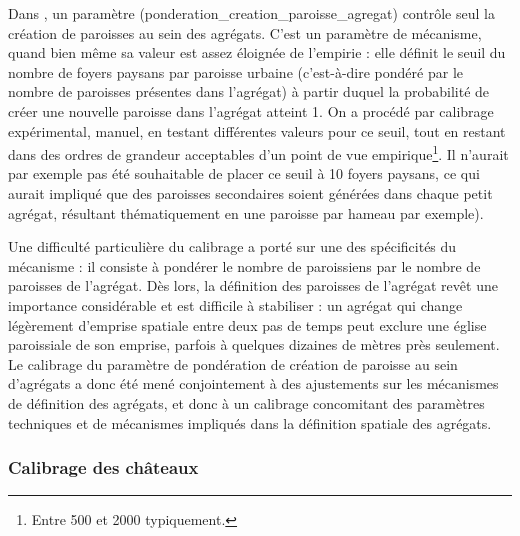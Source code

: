 Dans \simfeodal{}, un paramètre (\textsf{ponderation\_creation\_paroisse\_agregat}) contrôle seul la création de paroisses au sein des agrégats.
C'est un \og paramètre de mécanisme\fg{}, quand bien même sa valeur est assez éloignée de l'empirie : elle définit le seuil du nombre de foyers paysans par paroisse urbaine (c'est-à-dire pondéré par le nombre de paroisses présentes dans l'agrégat) à partir duquel la probabilité de créer une nouvelle paroisse dans l'agrégat atteint 1.
On a procédé par calibrage expérimental, manuel, en testant différentes valeurs pour ce seuil, tout en restant dans des ordres de grandeur acceptables d'un point de vue empirique\footnote{
	Entre 500 et 2000 typiquement.
}.
Il n'aurait par exemple pas été souhaitable de placer ce seuil à 10 foyers paysans, ce qui aurait impliqué que des paroisses secondaires soient générées dans chaque petit agrégat, résultant thématiquement en une paroisse par hameau par exemple).

Une difficulté particulière du calibrage a porté sur une des spécificités du mécanisme : il consiste à pondérer le nombre de paroissiens par le nombre de paroisses de l'agrégat.
Dès lors, la définition des \og paroisses de l'agrégat\fg{} revêt une importance considérable et est difficile à stabiliser : un agrégat qui change légèrement d'emprise spatiale entre deux pas de temps peut \og exclure\fg{} une église paroissiale de son emprise, parfois à quelques dizaines de mètres près seulement.
Le calibrage du paramètre de pondération de création de paroisse au sein d'agrégats a donc été mené conjointement à des ajustements sur les mécanismes de définition des agrégats, et donc à un calibrage concomitant des paramètres techniques et de mécanismes impliqués dans la définition spatiale des agrégats.

\subsubsection{Calibrage des châteaux \label{subsubsec:calibrage-chateaux}}

